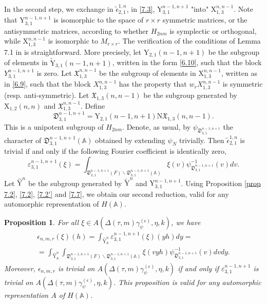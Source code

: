 \documentclass[12pts]{amsart}
\newcommand{\BA}{{\mathbb {A}}}
\newtheorem{prop}[thm]{Proposition}
\begin{document}
In the second step, we exchange in
$\widetilde{\epsilon}_{2,1}^{1,n}$, in \eqref{7.3},
$\mathrm{Y}_{3,1}^{n-1,n+1}$ "into" $\mathrm{X}_{1,3}^{n,n-1}$. Note
that $\mathrm{Y}_{3,1}^{n-1,n+1}$ is isomorphic to the space of  $r\times r$
symmetric matrices, or the antisymmetric matrices, according to whether $H_{2nm}$ is symplectic or orthogonal, while $\mathrm{X}_{1,3}^{n,n-1}$ is
isomorphic to $M_{r\times r}$. The verification of the conditions of
Lemma 7.1 in \cite{GRS11} is straightforward. More precisely, let
$\mathrm{Y}_{2,1}(n-1,n+1)$ be the subgroup of elements in
$\widetilde{\mathrm{Y}}_{3,1}(n-1,n+1)$, written in the form
\eqref{6.10}, such that the block $Y_{3,1}^{n-1,n+1}$ is zero. Let
$\mathfrak{X}_{1,3}^{n,n-1}$ be the subgroup of elements in
$\mathrm{X}_{1,3}^{n,n-1}$, written as in \eqref{6.9}, such that the
block $X_{1,3}^{n,n-1}$ has the property that $ w_r X_{1,3}^{n,n-1}$
is symmetric (resp. anti-symmetric). Let $\mathfrak{X}_{1,3}(n,n-1)$ be the subgroup
generated by $\mathrm{X}_{1,2}(n,n)$ and
$\mathfrak{X}_{1,3}^{n,n-1}$. Define
\begin{equation}\label{7.6}
\mathfrak{D}_{3,1}^{n-1,n+1}=\mathrm{Y}_{2,1}(n-1,n+1)\mathrm{N}\mathfrak{X}_{1,3}(n,n-1).
\end{equation}
This is a unipotent subgroup of $H_{2nm}$. Denote, as usual,
by $\psi_{\mathfrak{D}_{3,1}^{n-1,n+1}}$ the character of
$\mathfrak{D}_{3,1}^{n-1,n+1}(\BA)$ obtained by extending
$\psi_N$ trivially. Then $\widetilde{\epsilon}_{2,1}^{1,n}$ is
trivial if and only if the following Fourier coefficient is
identically zero,
\begin{equation}\label{7.7}
\varepsilon_{3,1}^{n-1,n+1}(\xi)=\int_{\mathfrak{D}_{3,1}^{n-1,n+1}(F)\backslash
	\mathfrak{D}_{3,1}^{n-1,n+1}(\BA)}\xi(v)\psi_{\mathfrak{D}_{3,1}^{n-1,n+1}}^{-1}(v)dv.
\end{equation}
Let $\hat{\mathrm{Y}}^n$ be the subgroup generated by $\widetilde{\mathrm{Y}}^n$ and $\mathrm{Y}_{3,1}^{n-1,n+1}$. Using Proposition \ref{prop 7.2}, \eqref{7.2}, \eqref{7.2'} and \eqref{7.7}, we obtain our second reduction, valid for any automorphic representation of
$H(\BA)$.

\begin{prop}\label{prop 7.3}
	For all $\xi\in A(\Delta(\tau,m)\gamma_\psi^{(\epsilon)},\eta,k)$, we have
	\begin{multline*}
			\epsilon_{n,m,r}(\xi)(h)=\int_{\hat{\mathrm{Y}}^n_\BA}\varepsilon_{3,1}^{n-1,n+1}(\xi)(yh)dy
	=\\
	=\int_{\hat{\mathrm{Y}}^n_\BA}\int_{\mathfrak{D}_{3,1}^{n-1,n+1}(F)\backslash \mathfrak{D}_{3,1}^{n-1,n+1}(\BA)}\xi(vyh)\psi^{-1}_{\mathfrak{D}_{3,1}^{n-1,n+1}}(v)dvdy.
	\end{multline*}
	Moreover, $\epsilon_{n,m,r}$ is trivial on 	$A(\Delta(\tau,m)\gamma_\psi^{(\epsilon)},\eta,k)$ if and only if 
	$\varepsilon_{3,1}^{n-1,n+1}$ is trivial on $A(\Delta(\tau,m)\gamma_\psi^{(\epsilon)},\eta,k)$. This proposition is valid for any automorphic representation $A$ of $H(\BA)$.
\end{prop}
\end{document}
